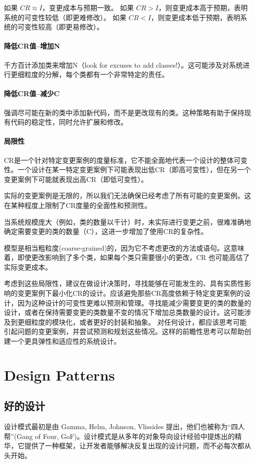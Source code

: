 如果 $CR \approx I$，变更成本与预期一致。
如果 $CR > I$，则变更成本高于预期，表明系统的可变性较低（即更难修改）。
如果 $CR < I$，则变更成本低于预期，表明系统的可变性较高（即更易修改）。

\subsubsection{降低CR值--增加N}
千方百计添加类来增加N（look for excuses to add classes!）。这可能涉及对系统进行更细粒度的分解，每个类都有一个非常特定的责任。

\subsubsection{降低CR值--减少C}
强调尽可能在新的类中添加新代码，而不是更改现有的类。这种策略有助于保持现有代码的稳定性，同时允许扩展和修改。

\subsubsection{局限性}
CR是一个针对特定变更案例的度量标准，它不能全面地代表一个设计的整体可变性。一个设计在某一特定变更案例下可能表现出低CR（即高可变性），但在另一个变更案例下可能就表现出高CR（即低可变性）。

实际的变更案例是无限的，所以我们无法确保已经考虑了所有可能的变更案例。这在某种程度上限制了CR度量的全面性和预测性。

当系统规模庞大（例如，类的数量以千计）时，未实际进行变更之前，很难准确地确定需要变更的类的数量（C），这进一步增加了使用CR的复杂性。

模型是相当粗粒度(coarse-grained)的，因为它不考虑更改的方法或语句。这意味着，即使更改影响到了多个类，如果每个类只需要很小的更改，CR 也可能高估了实际变更成本。

考虑到这些局限性，建议在做设计决策时，寻找能够在可能发生的、具有实质性影响的变更案例下最小化CR的设计。应该避免那些CR高度依赖于特定变更案例的设计，因为这种设计的可变性更难以预测和管理。寻找能减少需要变更的类的数量的设计，或者在保持需要变更的类数量不变的情况下增加总类数量的设计。这可能涉及到更细粒度的模块化，或者更好的封装和抽象。
对任何设计，都应该思考可能引起问题的变更案例，并尝试预测和规划这些情况。这样的前瞻性思考可以帮助创建一个更具弹性和适应性的系统设计。

\chapter{Design Patterns}

\section{好的设计}
设计模式最初是由 Gamma, Helm, Johnson, Vlissides 提出，他们也被称为“四人帮”(Gang of Four, GoF)。设计模式是从多年的对象导向设计经验中提炼出的精华，它提供了一种框架，让开发者能够解决反复出现的设计问题，而不必每次都从头开始。

